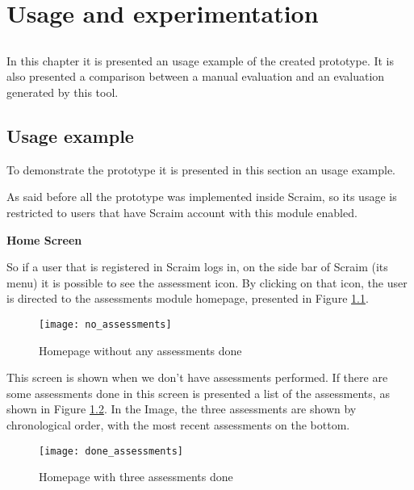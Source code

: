 \chapter{Usage and experimentation} \label{chap:usage}

\section*{}

In this chapter it is presented an usage example of the created prototype. It is also presented a comparison between a manual evaluation and an evaluation generated by this tool.

\section{Usage example} \label{sec:usageexample}

To demonstrate the prototype it is presented in this section an usage example.

As said before all the prototype was implemented inside Scraim, so its usage is restricted to users that have Scraim account with this module enabled.

\vspace{10 mm}

\textbf{Home Screen}

So if a user that is registered in Scraim logs in, on the side bar of Scraim (its menu) it is possible to see the assessment icon. By clicking on that icon, the user is directed to the assessments module homepage, presented in Figure \ref{fig:no_assessments}.

\begin{figure}[!htb]
	\begin{center}
		\leavevmode
		\texttt{[image: no\_assessments]}
		\caption{Homepage without any assessments done}
		\label{fig:no_assessments}
	\end{center}
\end{figure}

This screen is shown when we don't have assessments performed. If there are some assessments done in this screen is presented a list of the assessments, as shown in Figure \ref{fig:done_assessments}. In the Image, the three assessments are shown by chronological order, with the most recent assessments on the bottom.

\begin{figure}[!htb]
	\begin{center}
		\leavevmode
		\texttt{[image: done\_assessments]}
		\caption{Homepage with three assessments done}
		\label{fig:done_assessments}
	\end{center}
\end{figure}


